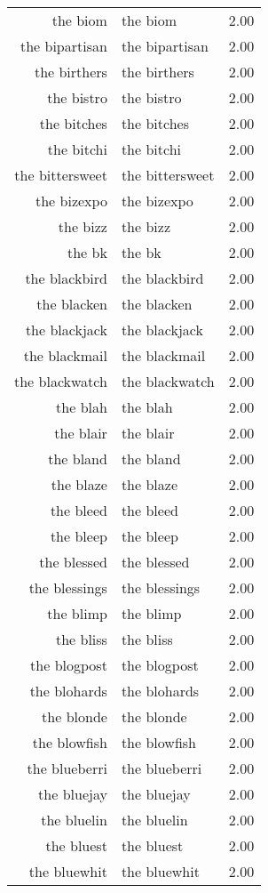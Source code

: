 \begin{table}[ht]
\begin{tabular}{rlr}
  the biom & the biom & 2.00 \\ 
  the bipartisan & the bipartisan & 2.00 \\ 
  the birthers & the birthers & 2.00 \\ 
  the bistro & the bistro & 2.00 \\ 
  the bitches & the bitches & 2.00 \\ 
  the bitchi & the bitchi & 2.00 \\ 
  the bittersweet & the bittersweet & 2.00 \\ 
  the bizexpo & the bizexpo & 2.00 \\ 
  the bizz & the bizz & 2.00 \\ 
  the bk & the bk & 2.00 \\ 
  the blackbird & the blackbird & 2.00 \\ 
  the blacken & the blacken & 2.00 \\ 
  the blackjack & the blackjack & 2.00 \\ 
  the blackmail & the blackmail & 2.00 \\ 
  the blackwatch & the blackwatch & 2.00 \\ 
  the blah & the blah & 2.00 \\ 
  the blair & the blair & 2.00 \\ 
  the bland & the bland & 2.00 \\ 
  the blaze & the blaze & 2.00 \\ 
  the bleed & the bleed & 2.00 \\ 
  the bleep & the bleep & 2.00 \\ 
  the blessed & the blessed & 2.00 \\ 
  the blessings & the blessings & 2.00 \\ 
  the blimp & the blimp & 2.00 \\ 
  the bliss & the bliss & 2.00 \\ 
  the blogpost & the blogpost & 2.00 \\ 
  the blohards & the blohards & 2.00 \\ 
  the blonde & the blonde & 2.00 \\ 
  the blowfish & the blowfish & 2.00 \\ 
  the blueberri & the blueberri & 2.00 \\ 
  the bluejay & the bluejay & 2.00 \\ 
  the bluelin & the bluelin & 2.00 \\ 
  the bluest & the bluest & 2.00 \\ 
  the bluewhit & the bluewhit & 2.00 \\ 

\end{tabular}
\end{table}
